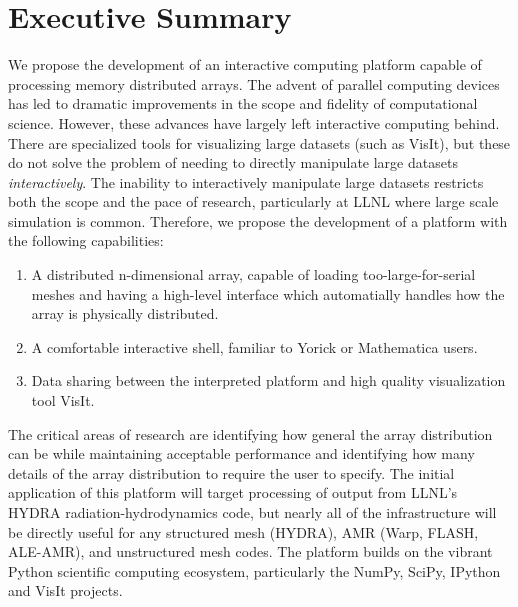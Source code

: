 \documentclass[letterpaper,12pt]{article}
\begin{document}

\setlength{\parindent}{15pt}
\section*{Executive Summary }
We propose the development of an interactive computing platform capable of processing memory distributed arrays.  The advent of parallel computing devices has led to dramatic improvements in the scope and fidelity of computational science.  However, these advances have largely left interactive computing behind.  There are specialized tools for visualizing large datasets (such as VisIt\cite{VisIt}), but these do not solve the problem of needing to directly manipulate large datasets \emph{interactively}.  The inability to interactively manipulate large datasets restricts both the scope and the pace of research, particularly at LLNL where large scale simulation is common.  Therefore, we propose the development of a platform with the following capabilities:

\begin{enumerate}
	\item A distributed n-dimensional array, capable of loading too-large-for-serial meshes 
          and having a high-level interface which automatially handles how 
          the array is physically distributed.

	\item A comfortable interactive shell, familiar to Yorick or Mathematica users.

	\item Data sharing between the interpreted platform and high quality visualization tool VisIt.
\end{enumerate}

The critical areas of research are identifying how general the array distribution can be 
while maintaining acceptable performance and identifying how many details of the array 
distribution to require the user to specify.  The initial application of this platform 
will target processing of output from LLNL's HYDRA\cite{Marinak2001} radiation-hydrodynamics 
code, but nearly all of the infrastructure will be directly useful for any structured mesh 
(HYDRA), AMR (Warp\cite{Grote2005}, FLASH\cite{flash}, ALE-AMR\cite{Koniges2010}), and 
unstructured mesh codes.  The platform builds on the vibrant Python scientific computing 
ecosystem, particularly the NumPy\cite{Oliphant2006}, SciPy\cite{numpyscipy}, 
IPython\cite{ipython} and VisIt projects.
\end{document}
